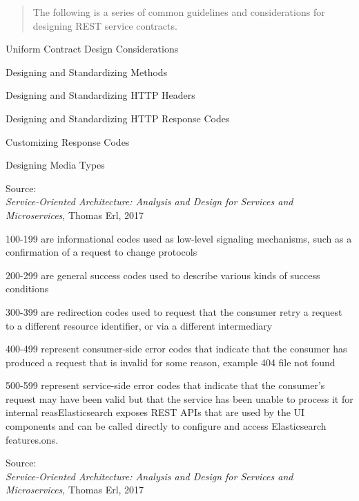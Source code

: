 \documentclass[Screen16to9,17pt]{foils}
\begin{document}


\begin{quote}
The following is a series of common guidelines and considerations for designing REST service contracts.
\end{quote}


\begin{list2}
\item Uniform Contract Design Considerations
\item Designing and Standardizing Methods
\item Designing and Standardizing HTTP Headers
\item Designing and Standardizing HTTP Response Codes
\item Customizing Response Codes
\item Designing Media Types
\end{list2}
Source: {\footnotesize\\
\emph{Service‑Oriented Architecture: Analysis and Design for Services and Microservices}, Thomas Erl, 2017}



\begin{list2}
\item 100-199 are informational codes used as low-level signaling mechanisms, such as a confirmation of a request to change protocols
\item 200-299 are general success codes used to describe various kinds of success conditions
\item 300-399 are redirection codes used to request that the consumer retry a request to a different resource identifier, or via a different intermediary
\item 400-499 represent consumer-side error codes that indicate that the consumer has produced a request that is invalid for some reason, example 404 file not found
\item 500-599 represent service-side error codes that indicate that the consumer’s request may have been valid but that the service has been unable to process it for internal reasElasticsearch exposes REST APIs that are used by the UI components and can be called directly to configure and access Elasticsearch features.ons.
\end{list2}
Source: {\footnotesize\\
\emph{Service‑Oriented Architecture: Analysis and Design for Services and Microservices}, Thomas Erl, 2017}
\end{document}
